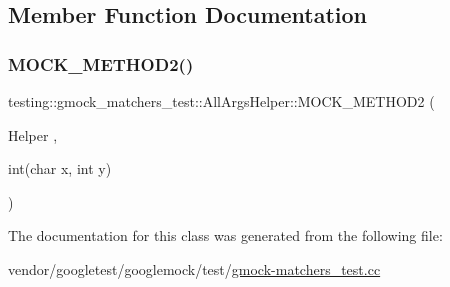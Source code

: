 \subsection{Member Function Documentation}
\mbox{\label{classtesting_1_1gmock__matchers__test_1_1_all_args_helper_a571b9c1e5ab4e891085060e73c94be32}} 
\subsubsection{\texorpdfstring{M\+O\+C\+K\+\_\+\+M\+E\+T\+H\+O\+D2()}{MOCK\_METHOD2()}}
{\footnotesize\ttfamily testing\+::gmock\+\_\+matchers\+\_\+test\+::\+All\+Args\+Helper\+::\+M\+O\+C\+K\+\_\+\+M\+E\+T\+H\+O\+D2 (\begin{DoxyParamCaption}\item[{Helper}]{,  }\item[{int(char x, int y)}]{ }\end{DoxyParamCaption})}



The documentation for this class was generated from the following file\+:\begin{DoxyCompactItemize}
\item 
vendor/googletest/googlemock/test/\hyperlink{gmock-matchers__test_8cc}{gmock-\/matchers\+\_\+test.\+cc}\end{DoxyCompactItemize}
